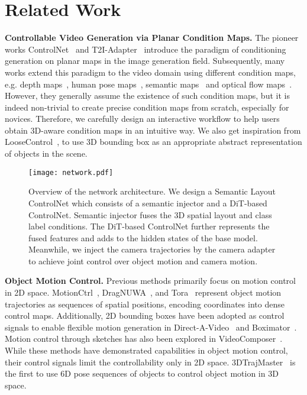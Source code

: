 
\section{Related Work}
\label{sec:formatting}

\noindent\textbf{Controllable Video Generation via Planar Condition Maps.} The pioneer works ControlNet~\cite{controlnet} and T2I-Adapter~\cite{mou2024t2i} introduce the paradigm of conditioning generation on planar maps in the image generation field. Subsequently, many works extend this paradigm to the video domain using different condition maps, e.g. depth maps~\cite{chen2023control}, human pose maps~\cite{hu2024animate}, semantic maps~\cite{wang2024easycontrol} and optical flow maps~\cite{motioni2v,koroglu2024onlyflow,bian2025gs}. However, they generally assume the existence of such condition maps, but it is indeed non-trivial to create precise condition maps from scratch, especially for novices. Therefore, we carefully design an interactive workflow to help users obtain 3D-aware condition maps in an intuitive way. We also get inspiration from LooseControl~\cite{bhat2024loosecontrol}, to use 3D bounding box as an appropriate abstract representation of objects in the scene.



\begin{figure*}[!t]
  \centering
  \texttt{[image: network.pdf]}
  \vspace{-15pt}
  \caption{Overview of the network architecture. We design a Semantic Layout ControlNet which consists of a semantic injector and a DiT-based ControlNet. Semantic injector fuses the 3D spatial layout and class label conditions. The DiT-based ControlNet further represents the fused features and adds to the hidden states of the base model. Meanwhile, we inject the camera trajectories by the camera adapter to achieve joint control over object motion and camera motion.}
  \label{fig:network}
  \vspace{-4pt}  
\end{figure*}


\noindent\textbf{Object Motion Control.} Previous methods primarily focus on motion control in 2D space. MotionCtrl~\cite{MotionCtrl}, DragNUWA~\cite{dragnuwa}, and Tora~\cite{Tora2024} represent object motion trajectories as sequences of spatial positions, encoding coordinates into dense control maps. Additionally, 2D bounding boxes have been adopted as control signals to enable flexible motion generation in Direct-A-Video~\cite{yang2024direct} and Boximator~\cite{boximator}. Motion control through sketches has also been explored in VideoComposer~\cite{VideoComposer}. 
While these methods have demonstrated capabilities in object motion control, their control signals limit the controllability only in 2D space. 3DTrajMaster~\cite{fu20243dtrajmaster} is the first to use 6D pose sequences of objects to control object motion in 3D space.




